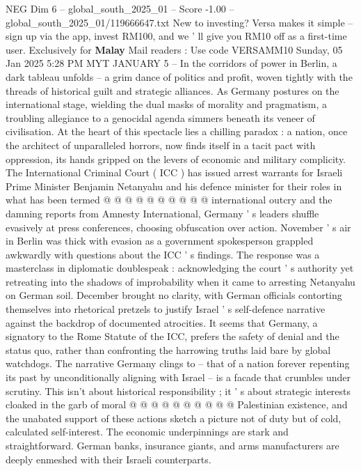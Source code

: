\begin{textsample}{NEG Dim 6 – global\_south\_2025\_01 – Score -1.00 – global\_south\_2025\_01/119666647.txt}  \label{ex:f6_neg_012}
New to investing?
Versa makes it simple -- sign up via the app, invest RM100, and we ' ll give you RM10 off as a first-time user.
Exclusively for \textbf{Malay} Mail readers : Use code VERSAMM10 Sunday, 05 Jan 2025 5:28 PM MYT JANUARY 5 -- In the corridors of power in Berlin, a dark tableau unfolds -- a grim dance of politics and profit, woven tightly with the threads of historical guilt and strategic alliances.
As Germany postures on the international stage, wielding the dual masks of morality and pragmatism, a troubling allegiance to a genocidal agenda simmers beneath its veneer of civilisation.
At the heart of this spectacle lies a chilling paradox : a nation, once the architect of unparalleled horrors, now finds itself in a tacit pact with oppression, its hands gripped on the levers of economic and military complicity.
The International Criminal Court ( ICC ) has issued arrest warrants for Israeli Prime Minister Benjamin Netanyahu and his defence minister for their roles in what has been termed @ @ @ @ @ @ @ @ @ @ international outcry and the damning reports from Amnesty International, Germany ' s leaders shuffle evasively at press conferences, choosing obfuscation over action.
November ' s air in Berlin was thick with evasion as a government spokesperson grappled awkwardly with questions about the ICC ' s findings.
The response was a masterclass in diplomatic doublespeak : acknowledging the court ' s authority yet retreating into the shadows of improbability when it came to arresting Netanyahu on German soil.
December brought no clarity, with German officials contorting themselves into rhetorical pretzels to justify Israel ' s self-defence narrative against the backdrop of documented atrocities.
It seems that Germany, a signatory to the Rome Statute of the ICC, prefers the safety of denial and the status quo, rather than confronting the harrowing truths laid bare by global watchdogs.
The narrative Germany clings to -- that of a nation forever repenting its past by unconditionally aligning with Israel -- is a facade that crumbles under scrutiny.
This isn't about historical responsibility ; it ' s about strategic interests cloaked in the garb of moral @ @ @ @ @ @ @ @ @ @ Palestinian existence, and the unabated support of these actions sketch a picture not of duty but of cold, calculated self-interest.
The economic underpinnings are stark and straightforward.
German banks, insurance giants, and arms manufacturers are deeply enmeshed with their Israeli counterparts.

\end{textsample}
